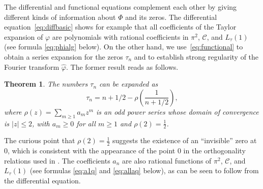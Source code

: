 \documentclass[12pt]{amsart}
\theoremstyle{plain}
\newtheorem{theorem}{Theorem}[section]
\numberwithin{equation}{section}
\theoremstyle{definition}
\renewcommand{\phi}{\varphi}
\newcommand{\Cone}{\mathscr{C}}
\begin{document}
The differential and functional equations complement each other by giving different kinds of information about 
$\Phi$ and its zeros. The differential equation~\eqref{eq:diffbasic} shows for example that 
all coefficients of the Taylor expansion of $\varphi$ are polynomials with rational 
coefficients in $\pi^2$, $\Cone$, and $L_{\tau}(1)$ (see formula \eqref{eq:phialg} below). 
On the other hand, we use~\eqref{eq:functional} to obtain a series 
expansion for the zeros $\tau_n$ and to establish strong regularity of the 
Fourier transform $\widehat{\phi}$. The former result reads as follows.
\begin{theorem}\label{thm:zeros}
The numbers $\tau_n$ can be expanded as
	\begin{equation} \label{eq:taunformula}
	\tau_n = n + 1/2 - \rho\left(\frac{1}{n+1/2}\right),
	\end{equation}
where $\rho(z) = \sum_{m\ge 1} a_m z^m$ is an odd power series whose domain of convergence is $|z|\le 2$, with $a_m\ge 0$ for all $m\ge 1$ and $\rho(2)=\frac12$.
 \end{theorem}
The curious point that $\rho(2)=\frac12$ suggests the existence of an ``invisible'' zero at $0$,  which is consistent with the appearance of the point $0$ in the orthogonality relations used in \cite[Lem. 3.3 and Sec. 8.2]{BCOS}. The coefficients $a_n$ are also rational functions of $\pi^2$, $\Cone$, and $L_{\tau}(1)$ (see formulas \eqref{eq:a1q} and \eqref{eq:allaq} below), as can be seen to follow from the differential equation.
\end{document}
